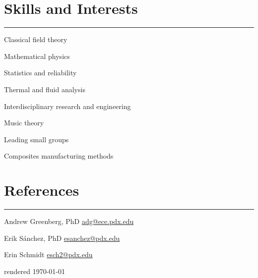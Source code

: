 \section{Skills and Interests}
\noindent\rule{\textwidth}{\hlinewidth}
\begin{multicols}{2}
	\begin{innerlist}
	\item Classical field theory
	\item Mathematical physics
	\item Statistics and reliability
	\item Thermal and fluid analysis
	\item Interdisciplinary research and engineering
	\item Music theory
	\item Leading small groups
	\item Composites manufacturing methods
	\end{innerlist}
\end{multicols}
\vfill
\section{References}
\noindent\rule{\textwidth}{\hlinewidth}
	\begin{innerlist}
	\item Andrew Greenberg, PhD \hfill\href{mailto:adg@ece.pdx.edu}{adg@ece.pdx.edu}
	\item Erik S\'anchez, PhD \hfill\href{mailto:esanchez@pdx.edu}{esanchez@pdx.edu}
	\item Erin Schmidt \hfill\href{mailto:esch2@pdx.edu}{esch2@pdx.edu}
	\end{innerlist}

\vfill
\centering rendered \today

